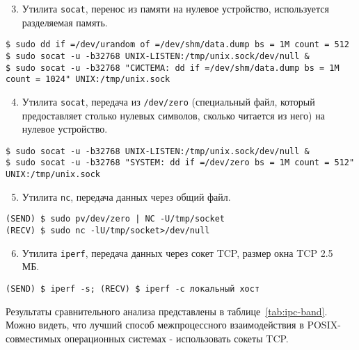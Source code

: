 \begin{enumerate}
\setcounter{enumi}{2}
\item Утилита \texttt{socat}, перенос из памяти на нулевое устройство, используется разделяемая память.
\end{enumerate}

\noindent
\begin{lstlisting}
$ sudo dd if =/dev/urandom of =/dev/shm/data.dump bs = 1M count = 512
$ sudo socat -u -b32768 UNIX-LISTEN:/tmp/unix.sock/dev/null &
$ sudo socat -u -b32768 "СИСТЕМА: dd if =/dev/shm/data.dump bs = 1M count = 1024" UNIX:/tmp/unix.sock
\end{lstlisting}


\begin{enumerate}
\setcounter{enumi}{3}
\item Утилита \texttt{socat}, передача из \texttt{/dev/zero} (специальный файл, который предоставляет столько нулевых символов, сколько читается из него) на нулевое устройство.
\end{enumerate}

\noindent
\begin{lstlisting}
$ sudo socat -u -b32768 UNIX-LISTEN:/tmp/unix.sock/dev/null &
$ sudo socat -u -b32768 "SYSTEM: dd if =/dev/zero bs = 1M count = 512" UNIX:/tmp/unix.sock
\end{lstlisting}

\begin{enumerate}
\setcounter{enumi}{4}
\item Утилита \texttt{nc}, передача данных через общий файл.
\end{enumerate}

\noindent
\begin{lstlisting}
(SEND) $ sudo pv/dev/zero | NC -U/tmp/socket
(RECV) $ sudo nc -lU/tmp/socket>/dev/null
\end{lstlisting}

\begin{enumerate}
\setcounter{enumi}{5}
\item Утилита \texttt{iperf}, передача данных через сокет TCP, размер окна TCP 2.5 \, МБ.
\end{enumerate}

\noindent
\begin{lstlisting}
(SEND) $ iperf -s; (RECV) $ iperf -c локальный хост
\end{lstlisting}

Результаты сравнительного анализа представлены в таблице~\cref{tab:ipc-band}. Можно видеть, что лучший способ межпроцессного взаимодействия в POSIX-совместимых операционных системах - использовать сокеты TCP.

